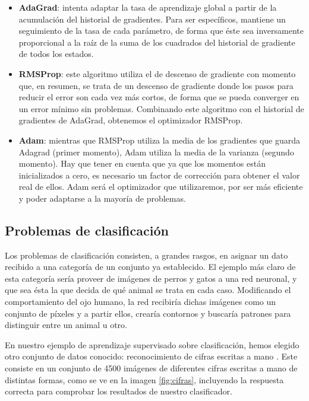 \begin{itemize}
    \item \textbf{AdaGrad}: intenta adaptar la tasa de aprendizaje global a partir de la acumulación del historial de gradientes. Para ser específicos, mantiene un seguimiento de la tasa de cada parámetro, de forma que éste sea inversamente proporcional a la raíz de la suma de los cuadrados del historial de gradiente de todos los estados. 
    \item \textbf{RMSProp}: este algoritmo utiliza el de descenso de gradiente con momento que, en resumen, se trata de un descenso de gradiente donde los pasos para reducir el error son cada vez más cortos, de forma que se pueda converger en un error mínimo sin problemas. Combinando este algoritmo con el historial de gradientes de AdaGrad, obtenemos el optimizador RMSProp. 
    \item \textbf{Adam}: mientras que RMSProp utiliza la media de los gradientes que guarda Adagrad (primer momento), Adam utiliza la media de la varianza (segundo momento). Hay que tener en cuenta que ya que los momentos están inicializados a cero, es necesario un factor de corrección para obtener el valor real de ellos. Adam será el optimizador que utilizaremos, por ser más eficiente y poder adaptarse a la mayoría de problemas. 
\end{itemize}

\subsection{Problemas de clasificación}
Los problemas de clasificación consisten, a grandes rasgos, en asignar un dato recibido a una categoría de un conjunto ya establecido. El ejemplo más claro de esta categoría sería proveer de imágenes de perros y gatos a una red neuronal, y que sea ésta la que decida de qué animal se trata en cada caso. Modificando el comportamiento del ojo humano, la red recibiría dichas imágenes como un conjunto de píxeles y a partir ellos, crearía contornos y buscaría patrones para distinguir entre un animal u otro.

En nuestro ejemplo de aprendizaje supervisado sobre clasificación, hemos elegido otro conjunto de datos conocido: reconocimiento de cifras escritas a mano \citep{lecun-mnisthandwrittendigit-2010}. Este consiste en un conjunto de 4500 imágenes de diferentes cifras escritas a mano de distintas formas, como se ve en la imagen \ref{fig:cifras}, incluyendo la respuesta correcta para comprobar los resultados de nuestro clasificador.

